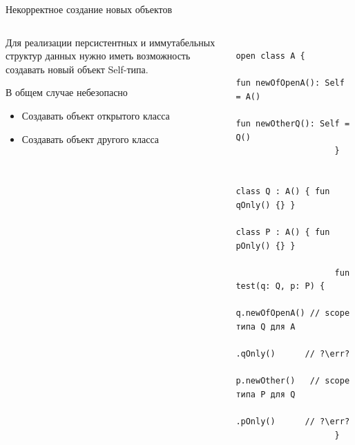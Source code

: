 \documentclass[usenames, dvipsnames]{beamer}
\newcommand{\err}[0]{\textcolor{red}{ошибка}}
\begin{document}
    \begin{frame}[fragile]{Некорректное создание новых объектов}
        \begin{columns}[onlytextwidth]
            \begin{column}[t]{0.46\textwidth}
                \vspace{0.5em}

                Для реализации персистентных и иммутабельных структур данных нужно иметь возможность создавать новый объект Self-типа.

                \vspace{1em}
                \begin{block}{В общем случае небезопасно}
                    \begin{itemize}
                        \item Создавать объект открытого класса
                        \item Создавать объект другого класса
                    \end{itemize}
                \end{block}
            \end{column}\hfill%
            \begin{column}[t]{0.50\textwidth}
                \begin{verbatim}
                    open class A {
                        fun newOfOpenA(): Self = A()
                        fun newOtherQ(): Self = Q()
                    }

                    class Q : A() { fun qOnly() {} }
                    class P : A() { fun pOnly() {} }

                    fun test(q: Q, p: P) {
                        q.newOfOpenA() // scope типа Q для A
                         .qOnly()      // ?\err?
                        p.newOther()   // scope типа P для Q
                         .pOnly()      // ?\err?
                    }
                \end{verbatim}
            \end{column}
        \end{columns}
    \end{frame}
\end{document}
